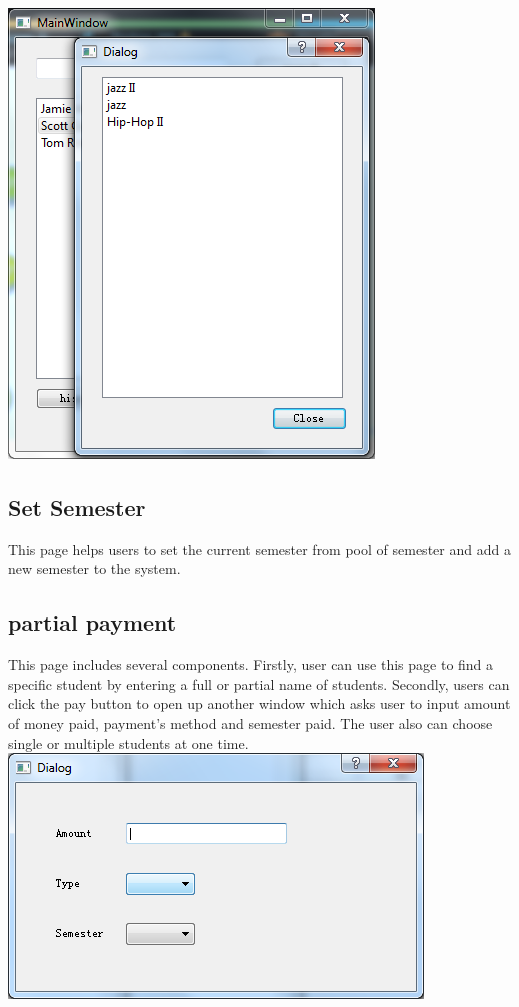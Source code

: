 \includegraphics[scale=0.5]{teacherHistory.png}

\subsection{Set Semester}
This page helps users to set the current semester from pool of semester and add a new semester to the system.

\subsection{partial payment}
This page includes several components. Firstly, user can use this page to find a specific student by entering a full or partial name of students. Secondly, users can click the pay button to open up another window which asks user to input amount of money paid, payment's method and semester paid. The user also can choose single or multiple students at one time. \\
\includegraphics[scale=0.5]{payment.png}

